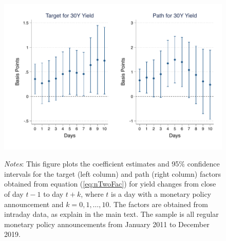 \documentclass{article}
\begin{document}
\begin{figure}[tbph]
\begin{center}
		\includegraphics[trim={0.6cm 0cm 0.5cm 0cm},clip,height=.2\textheight,width=1\textwidth]{persistsymgmxn30yr} \\
	\end{center}
	
	\vspace{-0.4cm} \caption*{\footnotesize{\textit{Notes}: This figure plots the coefficient estimates and 95\% confidence intervals for the target (left column) and path (right column) factors obtained from equation (\ref{eq:nTwoFac}) for yield changes from close of day \(t - 1\) to day \(t + k\), where \(t\) is a day with a monetary policy announcement and \(k = 0, 1, \ldots, 10\). The factors are obtained from intraday data, as explain in the main text. The sample is all regular monetary policy announcements from January 2011 to December 2019.}}
\end{figure}


%	
%	
\end{document}
